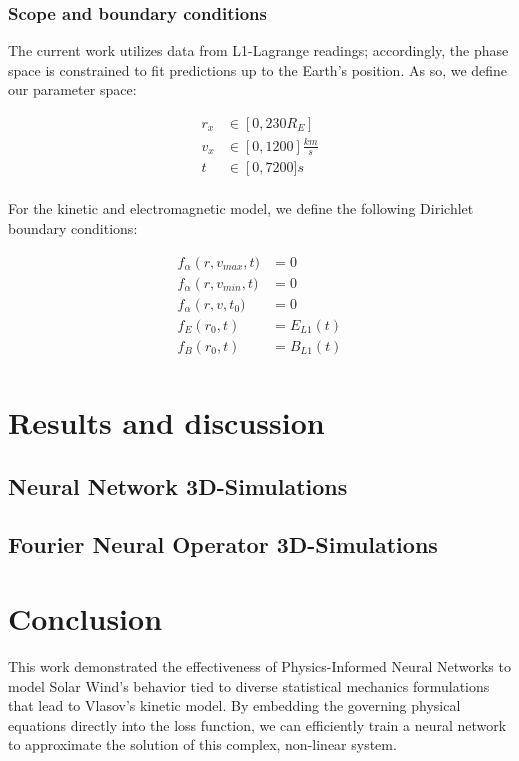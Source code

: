 \documentclass[12pt]{article}
\begin{document}
\subsubsection{Scope and boundary conditions}
The current work utilizes data from L1-Lagrange readings; accordingly, the phase space is constrained to fit predictions up to the Earth's position. As so, we define our parameter space:

\begin{align*}
    r_x &\in \left[0, 230R_E\right] \\
    v_x &\in \left[0, 1200\right]\frac{km}{s} \\
    t &\in \left[0, 7200]s \\
\end{align*}

For the kinetic and electromagnetic model, we define the following Dirichlet boundary conditions:

\begin{align*}
    f_\alpha\left(r, v_{max}, t) &= 0 \\
    f_\alpha\left(r, v_{min}, t) &= 0 \\
    f_\alpha\left(r, v, t_0) &= 0 \\
    f_E\left(r_0, t\right) &= E_{L1}(t) \\
    f_B\left(r_0, t\right) &= B_{L1}(t) \\
\end{align*}


\section{Results and discussion}

\subsection{Neural Network 3D-Simulations}

\subsection{Fourier Neural Operator 3D-Simulations}

\section{Conclusion}
This work demonstrated the effectiveness of Physics-Informed Neural Networks to model Solar Wind's behavior tied to diverse statistical mechanics formulations that lead to Vlasov's kinetic model. By embedding the governing physical equations directly into the loss function, we can efficiently train a neural network to approximate the solution of this complex, non-linear system.




\end{document}
